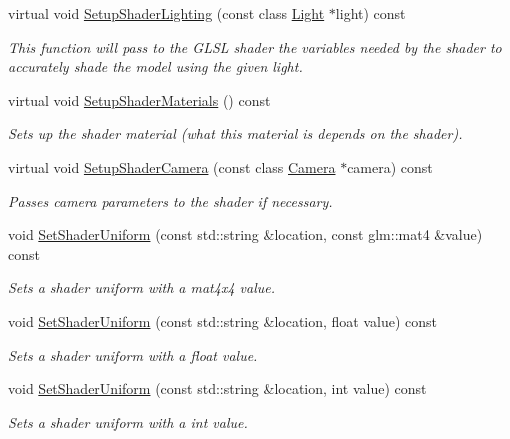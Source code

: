 \begin{DoxyCompactItemize}
virtual void \hyperlink{class_shader_program_a02cf3df43c59808160fce158ad655a40}{Setup\+Shader\+Lighting} (const class \hyperlink{class_light}{Light} $\ast$light) const
\begin{DoxyCompactList}\small\item\em This function will pass to the G\+L\+SL shader the variables needed by the shader to accurately shade the model using the given light. \end{DoxyCompactList}\item 
virtual void \hyperlink{class_shader_program_a20ea5669f122fa6143e7fa8ee9d92578}{Setup\+Shader\+Materials} () const
\begin{DoxyCompactList}\small\item\em Sets up the shader material (what this material is depends on the shader). \end{DoxyCompactList}\item 
virtual void \hyperlink{class_shader_program_abefd4e66aae75993f05bd607b6b0ed22}{Setup\+Shader\+Camera} (const class \hyperlink{class_camera}{Camera} $\ast$camera) const
\begin{DoxyCompactList}\small\item\em Passes camera parameters to the shader if necessary. \end{DoxyCompactList}\item 
void \hyperlink{class_shader_program_a84ff179a393c8dcd55c38eef19925fef}{Set\+Shader\+Uniform} (const std\+::string \&location, const glm\+::mat4 \&value) const
\begin{DoxyCompactList}\small\item\em Sets a shader uniform with a mat4x4 value. \end{DoxyCompactList}\item 
void \hyperlink{class_shader_program_a7ffbc023f4bb3ae2c8b458eb7182dff0}{Set\+Shader\+Uniform} (const std\+::string \&location, float value) const
\begin{DoxyCompactList}\small\item\em Sets a shader uniform with a float value. \end{DoxyCompactList}\item 
void \hyperlink{class_shader_program_a16164eb7e3f1e2ca9bf60c492e43b4df}{Set\+Shader\+Uniform} (const std\+::string \&location, int value) const
\begin{DoxyCompactList}\small\item\em Sets a shader uniform with a int value. \end{DoxyCompactList}\item 

\end{DoxyCompactItemize}
